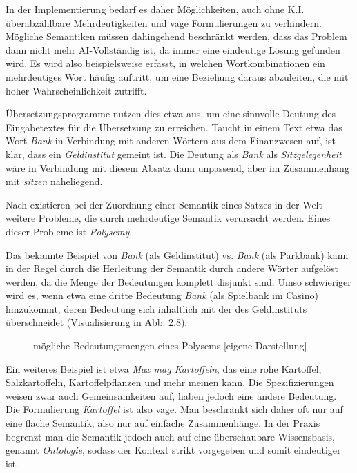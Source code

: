 \documentclass[12pt]{report}
\begin{document}
In der Implementierung bedarf es daher Möglichkeiten, auch ohne K.I. überabzählbare Mehrdeutigkeiten und vage Formulierungen zu verhindern. Mögliche Semantiken müssen dahingehend beschränkt werden, dass das Problem dann nicht mehr AI-Vollständig ist, da immer eine eindeutige Lösung gefunden wird. Es wird also beispielsweise erfasst, in welchen Wortkombinationen ein mehrdeutiges Wort häufig auftritt, um eine Beziehung daraus abzuleiten, die mit hoher Wahrscheinlichkeit zutrifft. 

Übersetzungsprogramme nutzen dies etwa aus, um eine sinnvolle Deutung des Eingabetextes für die Übersetzung zu erreichen. Taucht in einem Text etwa das Wort \textit{Bank} in Verbindung mit anderen Wörtern aus dem Finanzwesen auf, ist klar, dass ein \textit{Geldinstitut} gemeint ist. Die Deutung als \textit{Bank} als \textit{Sitzgelegenheit} wäre in Verbindung mit diesem Absatz dann unpassend, aber im Zusammenhang mit \textit{sitzen} naheliegend. 

Nach \cite{car52} existieren bei der Zuordnung einer Semantik eines Satzes in der Welt weitere Probleme, die durch mehrdeutige Semantik verursacht werden. Eines dieser Probleme ist \textit{Polysemy}. 

Das bekannte Beispiel von \textit{Bank} (als Geldinstitut) vs. \textit{Bank} (als Parkbank) kann in der Regel durch die Herleitung der Semantik durch andere Wörter aufgelöst werden, da die Menge der Bedeutungen komplett disjunkt sind. Umso schwieriger wird es, wenn etwa eine dritte Bedeutung \textit{Bank} (als Spielbank im Casino) hinzukommt, deren Bedeutung sich inhaltlich mit der des Geldinstituts überschneidet (Visualisierung in Abb. 2.8). 

\begin{figure}[h!]
\caption{mögliche Bedeutungsmengen eines Polysems [eigene Darstellung]}
\end{figure}

Ein weiteres Beispiel ist etwa \textit{\glqq  Max mag Kartoffeln\grqq{}}, das eine rohe Kartoffel, Salzkartoffeln, Kartoffelpflanzen und mehr meinen kann. Die Spezifizierungen weisen zwar auch Gemeinsamkeiten auf, haben jedoch eine andere Bedeutung. Die Formulierung \textit{Kartoffel} ist also vage.
Man beschränkt sich daher oft nur auf eine flache Semantik, also nur auf einfache Zusammenhänge. In der Praxis begrenzt man die Semantik jedoch auch auf eine überschaubare Wissensbasis, genannt \textit{\glqq  Ontologie\grqq{}}, sodass der Kontext strikt vorgegeben und somit eindeutiger ist.
\end{document}
